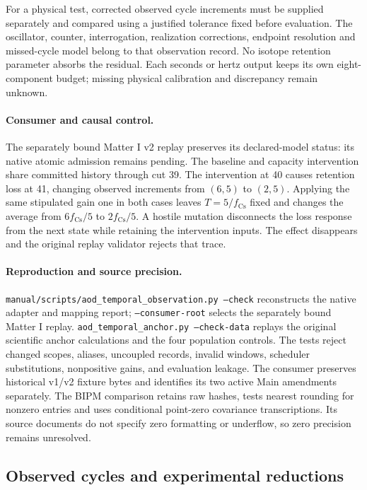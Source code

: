 For a physical test, corrected observed cycle increments must be supplied
separately and compared using a justified tolerance fixed before evaluation.
The oscillator, counter, interrogation, realization corrections, endpoint
resolution and missed-cycle model belong to that observation record.
No isotope retention parameter absorbs the residual.
Each seconds or hertz output keeps its own eight-component budget; missing
physical calibration and discrepancy remain unknown.

\paragraph{Consumer and causal control.}
The separately bound Matter I v2 replay preserves its declared-model status:
its native atomic admission remains pending. The baseline and capacity
intervention share committed history through cut 39. The intervention at 40
causes retention loss at 41, changing observed increments from \((6,5)\) to
\((2,5)\). Applying the same stipulated gain one in both cases leaves
\(T=5/f_{\mathrm{Cs}}\) fixed and changes the average from
\(6f_{\mathrm{Cs}}/5\) to \(2f_{\mathrm{Cs}}/5\).
A hostile mutation disconnects the loss response from the next state while
retaining the intervention inputs. The effect disappears and the original
replay validator rejects that trace.

\paragraph{Reproduction and source precision.}
\texttt{manual/scripts/aod\_temporal\_observation.py --check} reconstructs the native
adapter and mapping report; \texttt{--consumer-root} selects the
separately bound Matter I replay.
\texttt{aod\_temporal\_anchor.py --check-data} replays the original scientific anchor calculations and
the four population controls. The tests reject changed scopes, aliases,
uncoupled records, invalid windows, scheduler substitutions, nonpositive gains,
and evaluation leakage. The consumer preserves historical v1/v2 fixture bytes
and identifies its two active Main amendments separately.
The BIPM comparison retains raw hashes, tests nearest rounding for nonzero
entries and uses conditional point-zero covariance transcriptions.
Its source documents do not specify zero formatting or underflow, so zero
precision remains unresolved.

\subsection{Observed cycles and experimental reductions}
\label{manual:m3-metrology}
